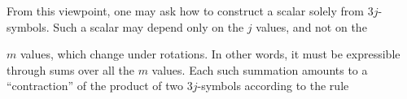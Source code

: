 From this viewpoint, one may ask how to construct a scalar solely from $3j$-symbols. Such a scalar may depend only on the $j$ values, and not on the

$m$ values, which change under rotations. In other words, it must be expressible through sums over all the $m$ values. Each such summation amounts to a ``contraction'' of the product of two $3j$-symbols according to the rule
